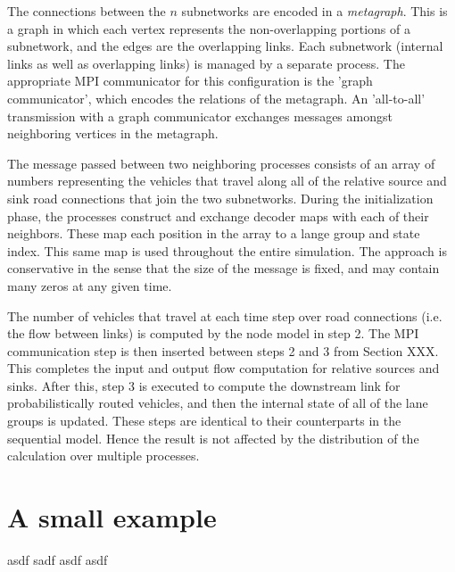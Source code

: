 The connections between the $n$ subnetworks are encoded in a \textit{metagraph}. This is a graph in which each vertex represents the non-overlapping portions of a subnetwork, and the edges are the overlapping links. Each subnetwork (internal links as well as overlapping links) is managed by a separate process. The appropriate MPI communicator for this configuration is the 'graph communicator', which encodes the relations of the metagraph. An 'all-to-all' transmission with a graph communicator exchanges messages amongst neighboring vertices in the metagraph. 

The message passed between two neighboring processes consists of an array of numbers representing the vehicles that travel along all of the relative source and sink road connections that join the two subnetworks. During the initialization phase, the processes construct and exchange decoder maps with each of their neighbors. These map each position in the array to a lange group and state index. This same map is used throughout the entire simulation. The approach is conservative in the sense that the size of the message is fixed, and may contain many zeros at any given time. 

The number of vehicles that travel at each time step over road connections (i.e. the flow between links) is computed by the node model in step 2. The MPI communication step is then inserted between steps 2 and 3 from Section XXX. This completes the input and output flow computation for relative sources and sinks. After this, step 3 is executed to compute the downstream link for probabilistically routed vehicles, and then the internal state of all of the lane groups is updated. These steps are identical to their counterparts in the sequential model. Hence the result is not affected by the distribution of the calculation over multiple processes.

\section{A small example}
asdf sadf asdf asdf 


